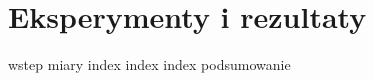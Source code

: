 \newcommand*{\resultssummary}[1]{
  Rezultaty oznaczają, że sieć rozważana w tym punkcie rozpoznaje poprawnie średnio \textbf{#1\%} pikseli na obrazie.
}
\newcommand{\resultsoriginal}{bazowej implementacji sieci \textit{Mask R-CNN}}
\newcommand{\resultsmodified}{zmodyfikowanej implementacji sieci \textit{Mask R-CNN}}
\newcommand{\withgenerated}{, wzbogaconym o sztucznie wygenerowane obrazy treningowe}
\newcommand*{\resultsintro}[3]{W tym punkcie przedstawiono rezultaty #1, trenowanej na zbiorze danych \textit{#2}#3.}

\chapter{Eksperymenty i rezultaty}

{wstep}
{miary}
{index}
{index}
\newpage
{index}
\newpage
{podsumowanie}
